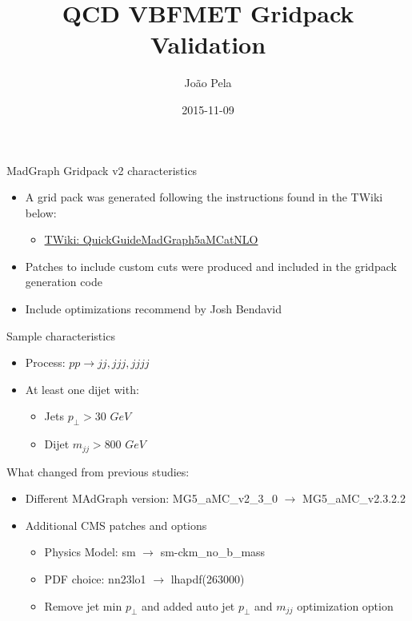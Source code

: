 \documentclass[8pt]{beamer}
\author[J. Pela]{João Pela}
\title{QCD VBFMET Gridpack Validation}
\institute[ICL]{Imperial College London}
\date{2015-11-09}
\begin{document}
\setlength{\unitlength}{1mm}


\begin{frame}
  \titlepage
\end{frame}


\begin{frame}{MadGraph Gridpack v2 characteristics}
  
\begin{itemize}
  \item A grid pack was generated following the instructions found in the TWiki below:
   \begin{itemize}
     \item \href{https://twiki.cern.ch/twiki/bin/viewauth/CMS/QuickGuideMadGraph5aMCatNLO}{TWiki: QuickGuideMadGraph5aMCatNLO}
   \end{itemize}
  \item Patches to include custom cuts were produced and included in the gridpack generation code
  \item Include optimizations recommend by Josh Bendavid
\end{itemize}

\begin{block}{Sample characteristics}

\begin{itemize}
  \item Process: $pp \rightarrow jj,jjj,jjjj$
  \item At least one dijet with:
  \begin{itemize}
    \item Jets $p_\perp > 30$ $GeV$
    \item Dijet $m_{jj} > 800$ $GeV$
  \end{itemize}
\end{itemize}

\end{block}

\begin{block}{What changed from previous studies:}

\begin{itemize}
  \item Different MAdGraph version: MG5\_aMC\_v2\_3\_0  $\rightarrow$ MG5\_aMC\_v2.3.2.2 
  \item Additional CMS patches and options
  \begin{itemize}
    \item Physics Model: sm $\rightarrow$ sm-ckm\_no\_b\_mass
    \item PDF choice: nn23lo1 $\rightarrow$ lhapdf(263000)
    \item Remove jet min $p_\perp$ and added auto jet $p_\perp$ and $m_{jj}$ optimization option
  \end{itemize}
\end{itemize}

\end{block}

\end{frame}
\end{document}
